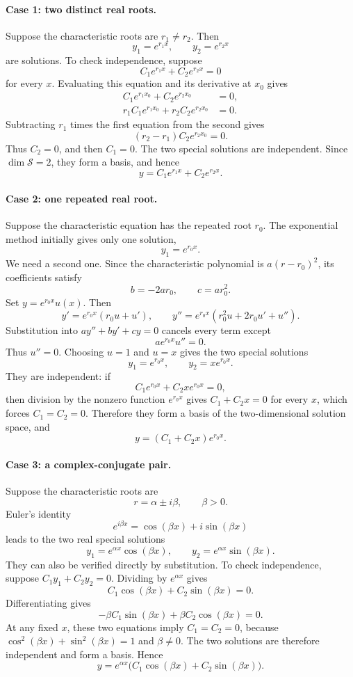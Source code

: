 \paragraph{Case 1: two distinct real roots.}
Suppose the characteristic roots are \(r_1\neq r_2\).  Then
\[
    y_1=e^{r_1x},
    \qquad
    y_2=e^{r_2x}
\]
are solutions.  To check independence, suppose
\[
    C_1e^{r_1x}+C_2e^{r_2x}=0
\]
for every \(x\).  Evaluating this equation and its derivative at \(x_0\)
gives
\[
    \begin{aligned}
        C_1e^{r_1x_0}+C_2e^{r_2x_0}&=0,\\
        r_1C_1e^{r_1x_0}+r_2C_2e^{r_2x_0}&=0.
    \end{aligned}
\]
Subtracting \(r_1\) times the first equation from the second gives
\[
    (r_2-r_1)C_2e^{r_2x_0}=0.
\]
Thus \(C_2=0\), and then \(C_1=0\).  The two special solutions are
independent.  Since \(\dim\mathcal{S}=2\), they form a basis, and hence
\[
    \boxed{y=C_1e^{r_1x}+C_2e^{r_2x}}.
\]

\paragraph{Case 2: one repeated real root.}
Suppose the characteristic equation has the repeated root \(r_0\).  The
exponential method initially gives only one solution,
\[
    y_1=e^{r_0x}.
\]
We need a second one.  Since the characteristic polynomial is
\(a(r-r_0)^2\), its coefficients satisfy
\[
    b=-2ar_0,
    \qquad
    c=ar_0^2.
\]
Set \(y=e^{r_0x}u(x)\).  Then
\[
    y'=e^{r_0x}(r_0u+u'),
    \qquad
    y''=e^{r_0x}(r_0^2u+2r_0u'+u'').
\]
Substitution into \(ay''+by'+cy=0\) cancels every term except
\[
    ae^{r_0x}u''=0.
\]
Thus \(u''=0\).  Choosing \(u=1\) and \(u=x\) gives the two special
solutions
\[
    y_1=e^{r_0x},
    \qquad
    y_2=xe^{r_0x}.
\]
They are independent: if
\[
    C_1e^{r_0x}+C_2xe^{r_0x}=0,
\]
then division by the nonzero function \(e^{r_0x}\) gives
\(C_1+C_2x=0\) for every \(x\), which forces \(C_1=C_2=0\).  Therefore
they form a basis of the two-dimensional solution space, and
\[
    \boxed{y=(C_1+C_2x)e^{r_0x}}.
\]

\paragraph{Case 3: a complex-conjugate pair.}
Suppose the characteristic roots are
\[
    r=\alpha\pm i\beta,
    \qquad \beta>0.
\]
Euler's identity
\[
    e^{i\beta x}=\cos(\beta x)+i\sin(\beta x)
\]
leads to the two real special solutions
\[
    y_1=e^{\alpha x}\cos(\beta x),
    \qquad
    y_2=e^{\alpha x}\sin(\beta x).
\]
They can also be verified directly by substitution.  To check independence,
suppose \(C_1y_1+C_2y_2=0\).  Dividing by \(e^{\alpha x}\) gives
\[
    C_1\cos(\beta x)+C_2\sin(\beta x)=0.
\]
Differentiating gives
\[
    -\beta C_1\sin(\beta x)
    +\beta C_2\cos(\beta x)=0.
\]
At any fixed \(x\), these two equations imply \(C_1=C_2=0\), because
\(\cos^2(\beta x)+\sin^2(\beta x)=1\) and \(\beta\neq0\).  The two
solutions are therefore independent and form a basis.  Hence
\[
    \boxed{
        y=e^{\alpha x}
        \bigl(C_1\cos(\beta x)+C_2\sin(\beta x)\bigr).}
\]

